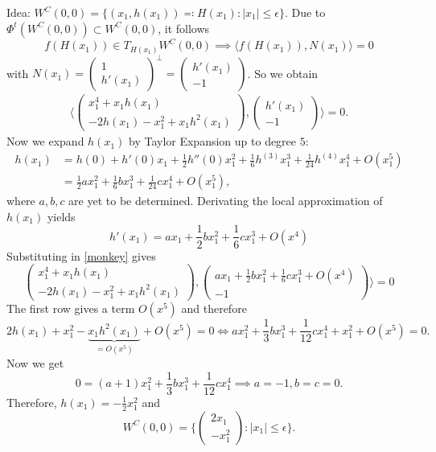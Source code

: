 \documentclass[a4paper,DIV=1]{article}
\theoremstyle{plain}
\begin{document}
\begin{enumerate}[label=(\alph*)]
	Idea: $W^C(0,0) = \{ (x_1, h(x_1)) \eqqcolon H(x_1) : |x_1| \leq \epsilon \}$. Due to $\Phi^t(W^C(0,0)) \subset W^C(0,0)$, it follows 
	\[
		f(H(x_1)) \in T_{H(x_1)}W^C(0,0) \implies \langle f(H(x_1)), N(x_1) \rangle = 0
	\]
	 with $N(x_1) = \begin{pmatrix}
		 1 \\ h'(x_1)
	 \end{pmatrix}^{\perp} = \begin{pmatrix}
		 h'(x_1) \\ -1
	 \end{pmatrix}$. So we obtain
	 \begin{align}\label{monkey}
	 	\langle \begin{pmatrix}
		 	x_1^4+x_1h(x_1) \\ -2h(x_1)-x_1^2+x_1h^2(x_1)
	 	\end{pmatrix}, \begin{pmatrix}
		 	h'(x_1) \\ -1
	 	\end{pmatrix}\rangle  = 0.
	 \end{align}
	 Now we expand $h(x_1)$ by Taylor Expansion up to degree $5$:
	 \begin{align*}
	 	h(x_1) &= h(0) + h'(0)x_1 + \frac{1}{2}h''(0)x_1^2 + \frac{1}{6}h^{(3)}x_1^3 + \frac{1}{24}h^{(4)}x_1^4 + O(x_1^5) \\
	 	&= \frac{1}{2}ax_1^2 + \frac{1}{6}bx_1^3 + \frac{1}{24}cx_1^4 + O(x_1^5),
	 \end{align*}
	 where $a,b,c$ are yet to be determined. Derivating the local approximation of $h(x_1)$ yields
	 \[
	 	h'(x_1) = ax_1 + \frac{1}{2}bx_1^2+\frac{1}{6}cx_1^3 + O(x^4)
	 \]
	 Substituting in \eqref{monkey} gives
	 \[
	 	 \begin{pmatrix}
	 	x_1^4+x_1h(x_1) \\ -2h(x_1)-x_1^2+x_1h^2(x_1)
	 	\end{pmatrix}, \begin{pmatrix}
	 	ax_1 + \frac{1}{2}bx_1^2+\frac{1}{6}cx_1^3 + O(x^4) \\ -1
	 	\end{pmatrix}\rangle  = 0
	 \]
	 The first row gives a term $O(x^5)$ and therefore
	 \[
	 	2h(x_1)+x_1^2-\underbrace{x_1h^2(x_1)}_{= O(x^5)} + O(x^5)= 0 \iff ax_1^2 + \frac{1}{3}bx_1^3 + \frac{1}{12}cx_1^4 +x_1^2 + O(x^5) = 0.
	 \]
	 Now we get
	 \[
	 	0 = (a+1)x_1^2+\frac{1}{3}bx_1^3 + \frac{1}{12}cx_1^4  \implies a=-1, b=c=0.
	 \]
	 Therefore, $h(x_1) = -\frac{1}{2}x_1^2$ and
	 \[
	 	W^C(0,0) = \{ \begin{pmatrix}
		 	2x_1 \\-x_1^2
	 	\end{pmatrix} : |x_1| \leq \epsilon \}.
	 \]
	 

\end{enumerate}
\end{document}
